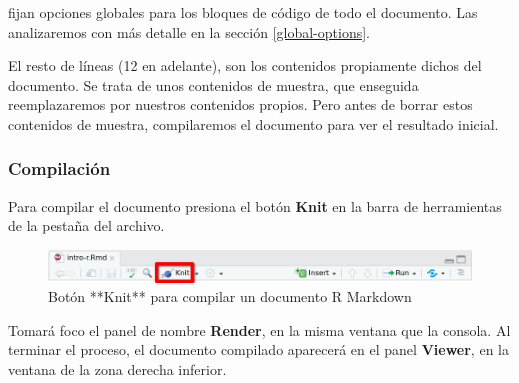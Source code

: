 \documentclass[
  title=normal,
  notoc,
  bib=normal]{mnye}
\begin{document}
fijan opciones globales para los bloques de código de todo el documento. Las analizaremos con más detalle en la sección \ref{global-options}.

El resto de líneas (12 en adelante), son los contenidos propiamente dichos del documento. Se trata de unos contenidos de muestra, que enseguida reemplazaremos por nuestros contenidos propios. Pero antes de borrar estos contenidos de muestra, compilaremos el documento para ver el resultado inicial.

\hypertarget{compilaciuxf3n}{%
\subsubsection{Compilación}\label{compilaciuxf3n}}

Para compilar el documento presiona el botón \textbf{Knit} en la barra de herramientas de la pestaña del archivo.

\begin{figure}

{\centering \includegraphics[width=1\linewidth]{images/knit} 

}

\caption{Botón **Knit** para compilar un documento R Markdown}\label{fig:unnamed-chunk-12}
\end{figure}

Tomará foco el panel de nombre \textbf{Render}, en la misma ventana que la consola. Al terminar el proceso, el documento compilado aparecerá en el panel \textbf{Viewer}, en la ventana de la zona derecha inferior.
\end{document}
